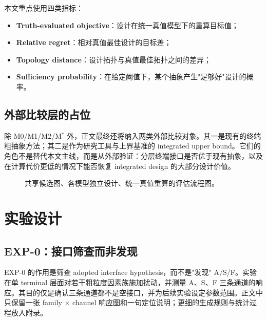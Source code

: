 \documentclass[review,authoryear]{elsarticle}
\begin{document}
本文重点使用四类指标：
\begin{itemize}
  \item \textbf{Truth-evaluated objective}：设计在统一真值模型下的重算目标值；
  \item \textbf{Relative regret}：相对真值最佳设计的目标差；
  \item \textbf{Topology distance}：设计拓扑与真值最佳拓扑之间的差异；
  \item \textbf{Sufficiency probability}：在给定阈值下，某个抽象产生"足够好"设计的概率。
\end{itemize}

\subsection{外部比较层的占位}
\label{sec:models:benchmark}

除 M0/M1/M2/M$^*$ 外，正文最终还将纳入两类外部比较对象。其一是现有的终端粗抽象方法；其二是作为研究工具与上界基准的 integrated upper bound。它们的角色不是替代本文主线，而是从外部验证：分层终端接口是否优于现有抽象，以及在计算代价更低的情况下能否恢复 integrated design 的大部分设计价值。

\begin{figure}[htbp]
  \centering
  \caption{共享候选图、各模型独立设计、统一真值重算的评估流程图。}
  \label{fig:protocol}
\end{figure}


\section{实验设计}
\label{sec:experiments}

\subsection{EXP-0：接口筛查而非发现}
\label{sec:exp:screening}

EXP-0 的作用是筛查 adopted interface hypothesis，而不是"发现" A/S/F。实验在单 terminal 层面对若干粗粒度因素族施加扰动，并测量 A、S、F 三条通道的响应。其目的仅是确认三条通道都不是空接口，并为后续实验设定参数范围。正文中只保留一张 family $\times$ channel 响应图和一句定位说明；更细的生成规则与统计过程放入附录。
\end{document}
